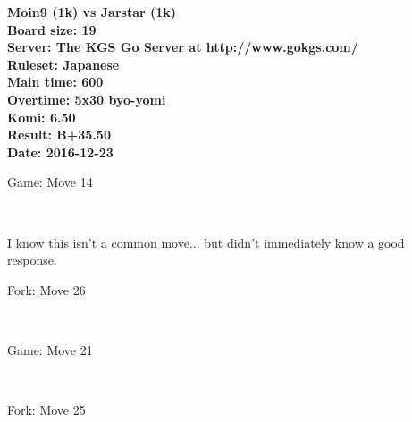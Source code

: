 \documentclass{article}
\begin{document}
\begin{titlepage}
    \null
    \vfill
    \begin{center}
        \textbf{Moin9 (1k) vs Jarstar (1k)}\\
        \textbf{Board size: 19}\\
        \textbf{Server: The KGS Go Server at http://www.gokgs.com/}\\
        \textbf{Ruleset: Japanese}\\
        \textbf{Main time: 600}\\
        \textbf{Overtime: 5x30 byo-yomi}\\
        \textbf{Komi: 6.50}\\
        \textbf{Result: B+35.50}\\
        \textbf{Date: 2016-12-23}
    \end{center}
    \vfill
\end{titlepage}
\newpage
\tableofcontents
\newpage
\begin{section}{Game: Move 14}
\begin{center}
\cleargoban
{}
\showfullgoban
\\\parbox{4.5in}{
I know this isn't a common move... but didn't immediately know a good response.}
\end{center}
\end{section}
\begin{subsection}{Fork: Move 26}
\begin{center}
\cleargoban
{}
\showfullgoban
\\\parbox{4.5in}{
}
\end{center}
\end{subsection}
\newpage
\begin{section}{Game: Move 21}
\begin{center}
\cleargoban
{}
\showfullgoban
\\\parbox{4.5in}{
}
\end{center}
\end{section}
\begin{subsection}{Fork: Move 25}
\begin{center}
\cleargoban
{}
\showfullgoban
\\\parbox{4.5in}{
}
\end{center}
\end{subsection}
\end{document}
